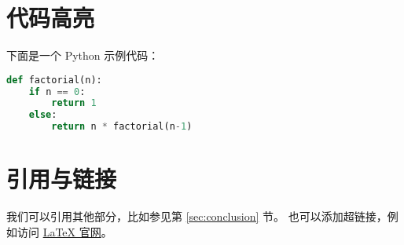 \documentclass[12pt]{article}
\begin{document}
\section{代码高亮}
下面是一个 Python 示例代码：
\begin{lstlisting}[language=Python]
def factorial(n):
    if n == 0:
        return 1
    else:
        return n * factorial(n-1)
\end{lstlisting}
\section{引用与链接}
我们可以引用其他部分，比如参见第 \ref{sec:conclusion} 节。
也可以添加超链接，例如访问 \href{https://www.latex-project.org}{LaTeX 官网}。
\end{document}
